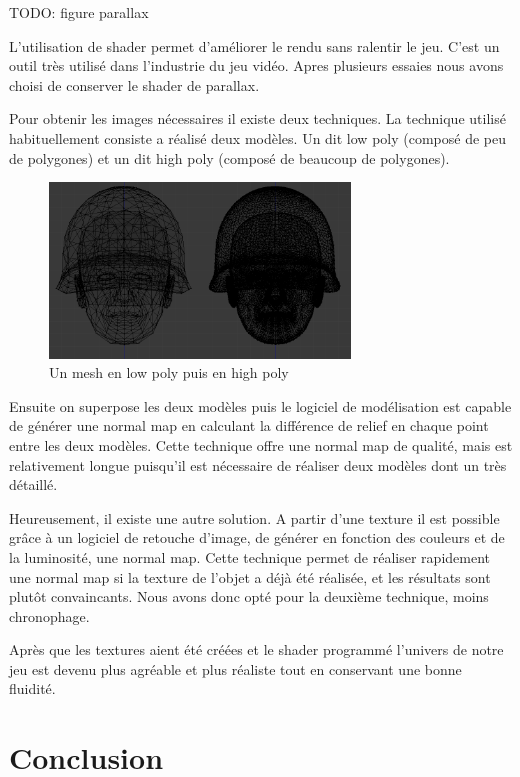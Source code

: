 \documentclass[11pt]{report}
\begin{document}
TODO: figure parallax

L’utilisation de shader permet d’améliorer le rendu sans ralentir le jeu. C’est un outil très utilisé dans l’industrie du jeu vidéo. Apres plusieurs essaies nous avons choisi de conserver le shader de parallax.

Pour obtenir les images nécessaires il existe deux techniques. La technique utilisé habituellement consiste a réalisé deux modèles. Un dit low poly (composé de peu de polygones) et un dit high poly (composé de beaucoup de polygones).

\begin{figure}[htbp]
\centering
\includegraphics[width=8cm]{lowpoly_vs_highpoly.png}
\caption{Un mesh en low poly puis en high poly}
\end{figure}

Ensuite on superpose les deux modèles puis le logiciel de modélisation est capable de générer une normal map en calculant la différence de relief en chaque point entre les deux modèles.
Cette technique offre une normal map de qualité, mais est relativement longue puisqu'il est nécessaire de réaliser deux modèles dont un très détaillé.

Heureusement, il existe une autre solution. A partir d'une texture il est possible grâce à un logiciel de retouche d'image, de générer en fonction des couleurs et de la luminosité, une normal map.
Cette technique permet de réaliser rapidement une normal map si la texture de l'objet a déjà été réalisée, et les résultats sont plutôt convaincants. Nous avons donc opté pour la deuxième technique, moins chronophage.

Après que les textures aient été créées et le shader programmé l’univers de notre jeu est devenu plus agréable et plus réaliste tout en conservant une bonne fluidité. 

\section{Conclusion}
\end{document}
